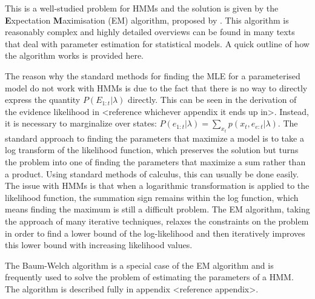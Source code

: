 This is a well-studied problem for HMMs and the solution is given by the \textbf{E}xpectation \textbf{M}aximisation (EM) algorithm, proposed by \citeauthor{Dempster1977MaximumAlgorithm}. This algorithm is reasonably complex and highly detailed overviews can be found in many texts that deal with parameter estimation for statistical models. A quick outline of how the algorithm works is provided here.\par


The reason why the standard methods for finding the MLE for a parameterised model do not work with HMMs is due to the fact that there is no way to directly express the quantity  $P(E_{1:t} | \lambda)$ directly. This can be seen in the derivation of the evidence likelihood in <reference whichever appendix it ends up in>. Instead, it is necessary to marginalize over states: $ P(e_{1:t} | \lambda) = \sum_{x_t}{p(x_t, e_{e:t} | \lambda)}$. The standard approach to finding the parameters that maximize a model is to take a log transform of the likelihood function, which preserves the solution but turns the problem into one of finding the parameters that maximize a sum rather than a product. Using standard methods of calculus, this can usually be done easily. The issue with HMMs is that when a logarithmic transformation is applied to the likelihood function, the summation sign remains within the log function, which means finding the maximum is still a difficult problem. The EM algorithm, taking the approach of many iterative techniques, relaxes the constraints on the problem in order to find a lower bound of the log-likelihood and then iteratively improves this lower bound with increasing likelihood values. 


The Baum-Welch algorithm is a special case of the EM algorithm and is frequently used to solve the problem of estimating the parameters of a HMM. The algorithm is described fully in appendix <reference appendix>.

















